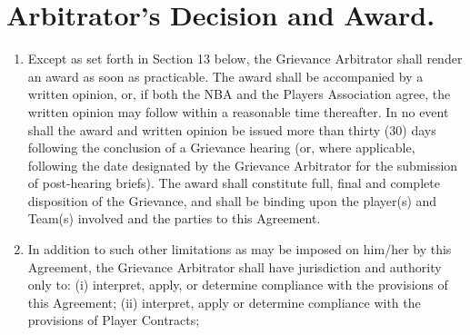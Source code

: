 \documentclass[
]{book}
\providecommand{\tightlist}{%
  \setlength{\itemsep}{0pt}\setlength{\parskip}{0pt}}
\begin{document}
\hypertarget{arbitrators-decision-and-award.}{%
\section{Arbitrator's Decision and Award.}\label{arbitrators-decision-and-award.}}

\begin{enumerate}
\def\labelenumi{(\alph{enumi})}
\tightlist
\item
  Except as set forth in Section 13 below, the Grievance Arbitrator shall render an award as soon as practicable. The award shall be accompanied by a written opinion, or, if both the NBA and the Players Association agree, the written opinion may follow within a reasonable time thereafter. In no event shall the award and written opinion be issued more than thirty (30) days following the conclusion of a Grievance hearing (or, where applicable, following the date designated by the Grievance Arbitrator for the submission of post-hearing briefs). The award shall constitute full, final and complete disposition of the Grievance, and shall be binding upon the player(s) and Team(s) involved and the parties to this Agreement.
\item
  In addition to such other limitations as may be imposed on him/her by this Agreement, the Grievance Arbitrator shall have jurisdiction and authority only to: (i) interpret, apply, or determine compliance with the provisions of this Agreement; (ii) interpret, apply or determine compliance with the provisions of Player Contracts;
\end{enumerate}
\end{document}
